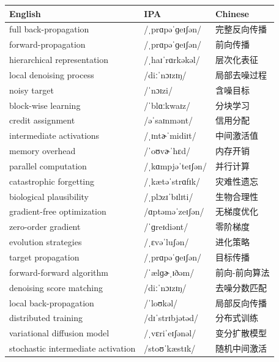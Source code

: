 \documentclass[UTF8,12pt,a4paper]{ctexart}
\providecommand{\zh}[1]{#1}
\begin{document}
\begin{tabular*}{\textwidth}{@{\extracolsep{\fill}}lll@{}}
\toprule
\textbf{English} & \textbf{IPA} & \textbf{Chinese} \\
\midrule
full back-propagation & {\ipafont /ˌprɑpəˈɡeɪʃən/} & \zh{完整反向传播} \\
forward-propagation & {\ipafont /ˌprɑpəˈɡeɪʃən/} & \zh{前向传播} \\
hierarchical representation & {\ipafont /ˌhaɪˈrɑrkəkəl/} & \zh{层次化表征} \\
local denoising process & {\ipafont /diːˈnɔɪzɪŋ/} & \zh{局部去噪过程} \\
noisy target & {\ipafont /ˈnɔɪzi/} & \zh{含噪目标} \\
block-wise learning & {\ipafont /ˈblɑːkwaɪz/} & \zh{分块学习} \\
credit assignment & {\ipafont /əˈsaɪnmənt/} & \zh{信用分配} \\
intermediate activations & {\ipafont /ˌɪntɚˈmidiɪt/} & \zh{中间激活值} \\
memory overhead & {\ipafont /ˈoʊvɚˈhɛd/} & \zh{内存开销} \\
parallel computation & {\ipafont /ˌkɑmpjəˈteɪʃən/} & \zh{并行计算} \\
catastrophic forgetting & {\ipafont /ˌkætəˈstrɑfɪk/} & \zh{灾难性遗忘} \\
biological plausibility & {\ipafont /ˌplɔzɪˈbɪlɪti/} & \zh{生物合理性} \\
gradient-free optimization & {\ipafont /ɑptəməˈzeɪʃən/} & \zh{无梯度优化} \\
zero-order gradient & {\ipafont /ˈɡreɪdiənt/} & \zh{零阶梯度} \\
evolution strategies & {\ipafont /ˌɛvəˈluʃən/} & \zh{进化策略} \\
target propagation & {\ipafont /ˌprɑpəˈɡeɪʃən/} & \zh{目标传播} \\
forward-forward algorithm & {\ipafont /ˈælɡɚˌɪðəm/} & \zh{前向-前向算法} \\
denoising score matching & {\ipafont /diːˈnɔɪzɪŋ/} & \zh{去噪分数匹配} \\
local back-propagation & {\ipafont /ˈloʊkəl/} & \zh{局部反向传播} \\
distributed training & {\ipafont /dɪˈstrɪbjətəd/} & \zh{分布式训练} \\
variational diffusion model & {\ipafont /ˌvɛriˈeɪʃənəl/} & \zh{变分扩散模型} \\
stochastic intermediate activation & {\ipafont /stoʊˈkæstɪk/} & \zh{随机中间激活} \\

\end{tabular*}
\end{document}
